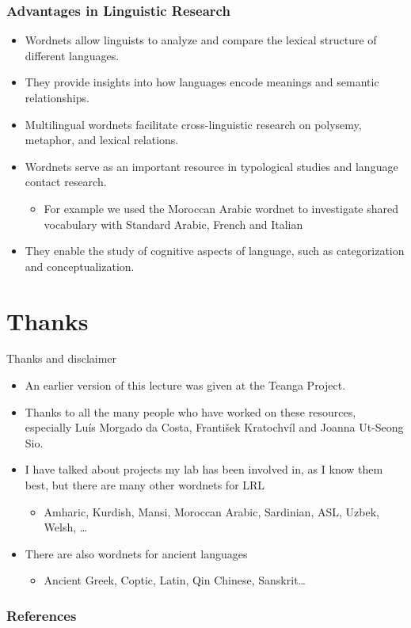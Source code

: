 \documentclass[xetex]{beamer}  %
\begin{document}
\begin{frame}
\frametitle{Advantages in Linguistic Research}

\begin{itemize}
    \item Wordnets allow linguists to analyze and compare the lexical structure of different languages.
    \item They provide insights into how languages encode meanings and semantic relationships.
    \item Multilingual wordnets facilitate cross-linguistic research on polysemy, metaphor, and lexical relations.
    \item Wordnets serve as an important resource in typological studies and language contact research.
      \begin{itemize}
      \item For example we used the Moroccan Arabic wordnet to investigate shared vocabulary with Standard Arabic, French and Italian \citep{Mrini:Bond:2018}
      \end{itemize}
    \item They enable the study of cognitive aspects of language, such as categorization and conceptualization.
\end{itemize}
\end{frame}

\section{Thanks}

\begin{frame}{Thanks and disclaimer}

  \begin{itemize}
  \item An earlier version of this lecture was given at the Teanga Project.
  \item Thanks to all the many people who have worked on these
    resources, especially Luís Morgado da Costa, František Kratochvíl
    and Joanna Ut-Seong Sio.
  \item I have talked about projects my lab has been involved in, as I know them best, but there are many other wordnets for LRL
    \begin{itemize}
    \item Amharic, Kurdish, Mansi, Moroccan Arabic, Sardinian, ASL, Uzbek, Welsh, \ldots
    \end{itemize}
  \item There are also wordnets for ancient languages \begin{itemize}
    \item Ancient Greek, Coptic, Latin, Qin Chinese, Sanskrit\ldots
    \end{itemize}
  \end{itemize}


  
\end{frame}


\begin{frame}[allowframebreaks]
        \frametitle{References}
        
        
\end{frame}
\end{document}
